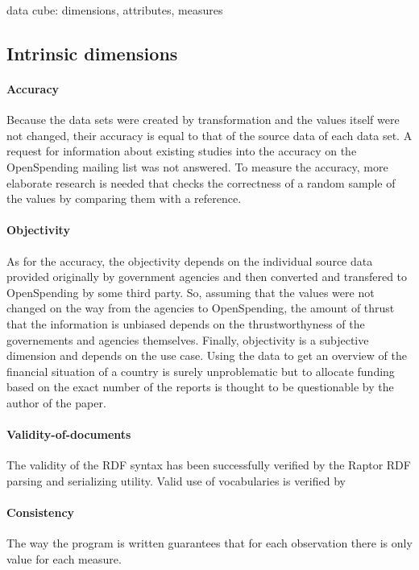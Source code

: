 \documentclass[sw]{iosart2x}
\begin{document}
data cube: dimensions, attributes, measures
\fi


\iffalse
\subsection{Intrinsic dimensions}

\paragraph{Accuracy}
Because the data sets were created by transformation and the values itself were not changed, their accuracy is equal to that of the source data of each data set.
A request for information about existing studies into the accuracy on the OpenSpending mailing list was not answered.
To measure the accuracy, more elaborate research is needed that checks the correctness of a random sample of the values by comparing them with a reference.

\paragraph{Objectivity}
As for the accuracy, the objectivity depends on the individual source data provided originally by government agencies and then converted and transfered to OpenSpending by some third party.
So, assuming that the values were not changed on the way from the agencies to OpenSpending, the amount of thrust that the information is unbiased depends on the thrustworthyness of the governements and agencies themselves.
Finally, objectivity is a subjective dimension and depends on the use case.
Using the data to get an overview of the financial situation of a country is surely unproblematic but to allocate funding based on the exact number of the reports is thought to be questionable by the author of the paper.
\paragraph{Validity-of-documents}
The validity of the RDF syntax has been successfully verified by the Raptor RDF parsing and serializing utility.
Valid use of vocabularies is verified by 

\paragraph{Consistency}
The way the program is written guarantees that for each observation there is only value for each measure.
\end{document}
